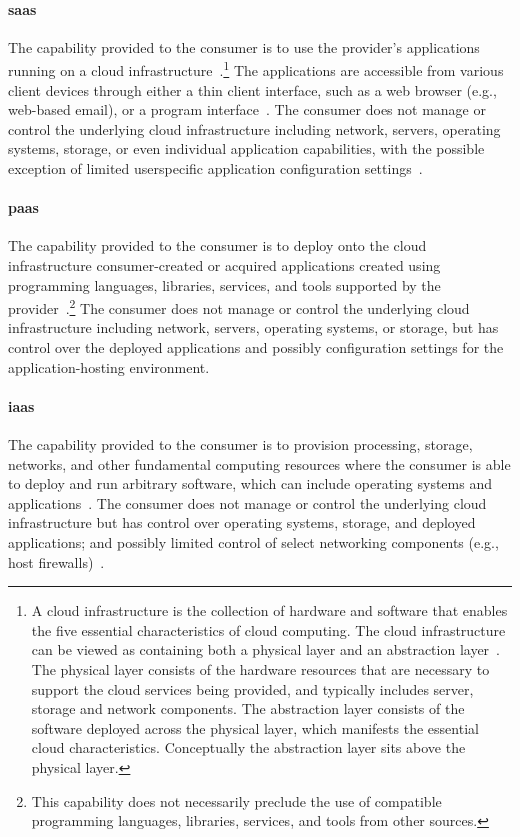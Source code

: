\documentclass[
a4paper,
twoside,
headsepline,
cleardoublepage=empty,
parskip=half,
draft=false
]{scrbook}
\begin{document}
			\paragraph{\gls{saas}} The capability provided to the consumer is to use the provider's applications running on a cloud infrastructure~\cite{mell2011nist}.\footnote{A cloud infrastructure is the collection of hardware and software that enables the five essential characteristics of cloud computing. The cloud infrastructure can be viewed as containing both a physical layer and an abstraction layer~\cite{fehling2014cloud}. The physical layer consists of the hardware resources that are necessary to support the cloud services being provided, and typically includes server, storage and network components. The abstraction layer consists of the software deployed across the physical layer, which manifests the essential cloud characteristics. Conceptually the abstraction layer sits above the physical layer.}
			The applications are accessible from various client devices through either a thin client interface, such as a web browser (e.g., web-based email), or a program interface~\cite{mell2011nist}.
			The consumer does not manage or control the underlying cloud infrastructure including network, servers, operating systems, storage, or even individual application capabilities, with the possible exception of limited userspecific application configuration settings~\cite{mell2011nist}.

			\paragraph{\gls{paas}} The capability provided to the consumer is to deploy onto the cloud infrastructure consumer-created or acquired applications created using programming languages, libraries, services, and tools supported by the provider~\cite{fehling2014cloud}.\footnote{This capability does not necessarily preclude the use of compatible programming languages, libraries, services, and tools from other sources.}
			The consumer does not manage or control the underlying cloud infrastructure including network, servers, operating systems, or storage, but has control over the deployed applications and possibly configuration settings for the application-hosting environment.

			\paragraph{\gls{iaas}} The capability provided to the consumer is to provision processing, storage, networks, and other fundamental computing resources where the consumer is able to deploy and run arbitrary software, which can include operating systems and applications~\cite{leymann2011cloud}. The consumer does not manage or control the underlying cloud infrastructure but has control over operating systems, storage, and deployed applications; and possibly limited control of select networking components (e.g., host firewalls)~\cite{mell2011nist}.
\end{document}
